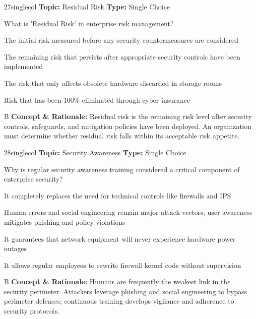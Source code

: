 \begin{qcard}{27}{singlecol}
\textcolor{darkslate!75}{\small\textbf{Topic:} Residual Risk \hfill \textbf{Type:} Single Choice}\vspace{0.4em}\par
What is 'Residual Risk' in enterprise risk management?
\begin{qoptions}
\item The initial risk measured before any security countermeasures are considered
\item The remaining risk that persists after appropriate security controls have been implemented
\item The risk that only affects obsolete hardware discarded in storage rooms
\item Risk that has been 100\% eliminated through cyber insurance
\end{qoptions}
\end{qcard}
\nopagebreak
\begin{explainbox}{B}
\textbf{Concept \& Rationale:} Residual risk is the remaining risk level after security controls, safeguards, and mitigation policies have been deployed. An organization must determine whether residual risk falls within its acceptable risk appetite.
\end{explainbox}

\begin{qcard}{28}{singlecol}
\textcolor{darkslate!75}{\small\textbf{Topic:} Security Awareness \hfill \textbf{Type:} Single Choice}\vspace{0.4em}\par
Why is regular security awareness training considered a critical component of enterprise security?
\begin{qoptions}
\item It completely replaces the need for technical controls like firewalls and IPS
\item Human errors and social engineering remain major attack vectors; user awareness mitigates phishing and policy violations
\item It guarantees that network equipment will never experience hardware power outages
\item It allows regular employees to rewrite firewall kernel code without supervision
\end{qoptions}
\end{qcard}
\nopagebreak
\begin{explainbox}{B}
\textbf{Concept \& Rationale:} Humans are frequently the weakest link in the security perimeter. Attackers leverage phishing and social engineering to bypass perimeter defenses; continuous training develops vigilance and adherence to security protocols.
\end{explainbox}

